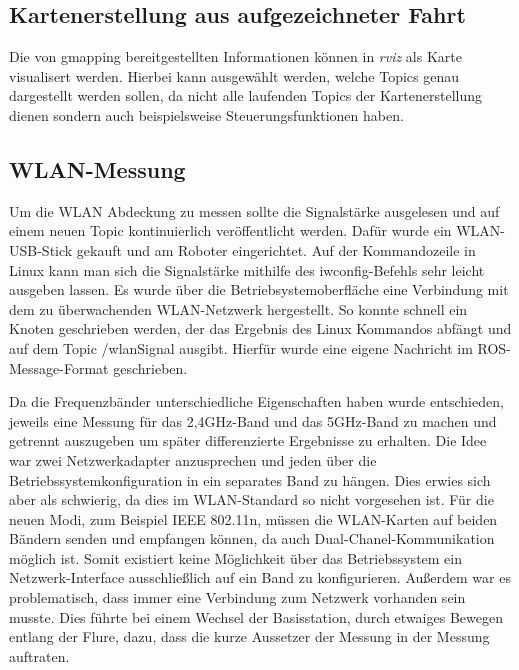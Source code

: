 \documentclass{scrartcl}%
\begin{document}
\subsection{Kartenerstellung aus aufgezeichneter Fahrt}
Die von gmapping bereitgestellten Informationen können in \textit{rviz} als Karte visualisert werden. Hierbei kann ausgewählt werden, welche Topics genau dargestellt werden sollen, da nicht alle laufenden Topics der Kartenerstellung dienen sondern auch beispielsweise Steuerungsfunktionen haben.

\subsection{WLAN-Messung}
Um die WLAN Abdeckung zu messen sollte die Signalstärke ausgelesen und auf einem neuen Topic kontinuierlich veröffentlicht werden. Dafür wurde ein WLAN-USB-Stick gekauft und am Roboter eingerichtet. Auf der Kommandozeile in Linux kann man sich die Signalstärke mithilfe des iwconfig-Befehls sehr leicht ausgeben lassen. Es wurde über die Betriebsystemoberfläche eine Verbindung mit dem zu überwachenden WLAN-Netzwerk hergestellt. So konnte schnell ein Knoten geschrieben werden, der das Ergebnis des Linux Kommandos abfängt und auf dem Topic /wlanSignal ausgibt. Hierfür wurde eine eigene Nachricht im ROS-Message-Format geschrieben.

Da die Frequenzbänder unterschiedliche Eigenschaften haben wurde entschieden, jeweils eine Messung für das 2,4GHz-Band und das 5GHz-Band zu machen und getrennt auszugeben um später differenzierte Ergebnisse zu erhalten. Die Idee war zwei Netzwerkadapter anzusprechen und jeden über die Betriebssystemkonfiguration in ein separates Band zu hängen. Dies erwies sich aber als schwierig, da dies im WLAN-Standard so nicht vorgesehen ist. Für die neuen Modi, zum Beispiel IEEE 802.11n, müssen die WLAN-Karten auf beiden Bändern senden und empfangen können, da auch Dual-Chanel-Kommunikation möglich ist. Somit existiert keine Möglichkeit über das Betriebssystem ein Netzwerk-Interface ausschließlich auf ein Band zu konfigurieren. Außerdem war es problematisch, dass immer eine Verbindung zum Netzwerk vorhanden sein musste. Dies führte bei einem Wechsel der Basisstation, durch etwaiges Bewegen entlang der Flure, dazu, dass die kurze Aussetzer der Messung in der Messung auftraten. 
\end{document}
